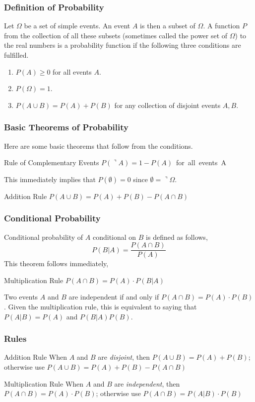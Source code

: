 \documentclass[xcolor=dvipsnames]{beamer}
\begin{document}
\begin{frame}
  \frametitle{Definition of Probability}
Let $\Omega$ be a set of simple events. An event $A$ is then a subset
of $\Omega$. A function $P$ from the collection of all these subsets
(sometimes called the power set of $\Omega$) to the real numbers is a
\alert{probability function} if the following three conditions are
fulfilled.
\begin{enumerate}
\item<1-> $P(A)\geq{}0$ for all events $A$.
\item<2-> $P(\Omega)=1$.
\item<3->
  $P(A\cup{}B)=P(A)+P(B)$
  for any collection of disjoint events $A,B$.
\end{enumerate}
\end{frame}

\begin{frame}
  \frametitle{Basic Theorems of Probability}
Here are some basic theorems that follow from the conditions.
\begin{block}{Rule of Complementary Events}
  $P(\urcorner{}A)=1-P(A)$\mbox{ for all events }A
\end{block}
This immediately implies that $P(\emptyset)=0$ since
$\emptyset=\urcorner\Omega$.
\begin{block}{Addition Rule}
  $P(A\cup{}B)=P(A)+P(B)-P(A\cap{}B)$
\end{block}
\end{frame}

\begin{frame}
  \frametitle{Conditional Probability}
Conditional probability of $A$ conditional on $B$ is defined as follows,
\begin{equation}
  \label{eq:iekeengi}
  P(B|A)=\frac{P(A\cap{}B)}{P(A)}
\end{equation}
This theorem follows immediately,
\begin{block}{Multiplication Rule}
  $P(A\cap{}B)=P(A)\cdot{}P(B|A)$
\end{block}
Two events $A$ and $B$ are \alert{independent} if and only if
$P(A\cap{}B)=P(A)\cdot{}P(B)$. Given the multiplication rule, this is
equivalent to saying that $P(A|B)=P(A)$ and $P(B|A)P(B)$.
\end{frame}

\begin{frame}
  \frametitle{Rules}
  \begin{block}{Addition Rule}
    When $A$ and $B$ are \emph{disjoint}, then
    $P(A\cup{}B)=P(A)+P(B)$; otherwise use
    $P(A\cup{}B)=P(A)+P(B)-P(A\cap{}B)$
\end{block}
\bigskip
\begin{block}{Multiplication Rule}
  When $A$ and $B$ are \emph{independent}, then
  $P(A\cap{}B)=P(A)\cdot{}P(B)$; otherwise use
  $P(A\cap{}B)=P(A|B)\cdot{}P(B)$
\end{block}
\end{frame}
\end{document}
